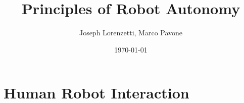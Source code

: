\documentclass[nohyper,nobib]{tufte-book}
\title{Principles of Robot Autonomy}
\author{Joseph Lorenzetti, Marco Pavone}
\date{\today}
\begin{document}
\chapter{Human Robot Interaction}


\printbibliography
\end{document}
